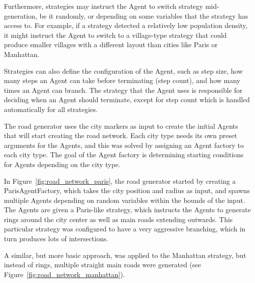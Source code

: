 Furthermore, strategies may instruct the Agent to switch strategy mid-generation, be it randomly, or depending on some variables that the strategy has access to.
For example, if a strategy detected a relatively low population density, it might instruct the Agent to switch to a village-type strategy that could produce smaller villages with a different layout than cities like Paris or Manhattan.

Strategies can also define the configuration of the Agent, such as step size, how many steps an Agent can take before terminating (step count), and how many times an Agent can branch.
The strategy that the Agent uses is responsible for deciding when an Agent should terminate, except for step count which is handled automatically for all strategies.

The road generator uses the city markers as input to create the initial Agents that will start creating the road network.
Each city type needs its own preset arguments for the Agents, and this was solved by assigning an Agent factory to each city type.
The goal of the Agent factory is determining starting conditions for Agents depending on the city type.

In Figure~\ref{fig:road_network_paris}, the road generator started by creating a ParisAgentFactory, which takes the city position and radius as input, and spawns multiple Agents depending on random variables within the bounds of the input.
The Agents are given a Paris-like strategy, which instructs the Agents to generate rings around the city center as well as main roads extending outwards.
This particular strategy was configured to have a very aggressive branching, which in turn produces lots of intersections.

A similar, but more basic approach, was applied to the Manhattan strategy, but instead of rings, multiple straight main roads were generated (see Figure~\ref{fig:road_network_manhattan}).

